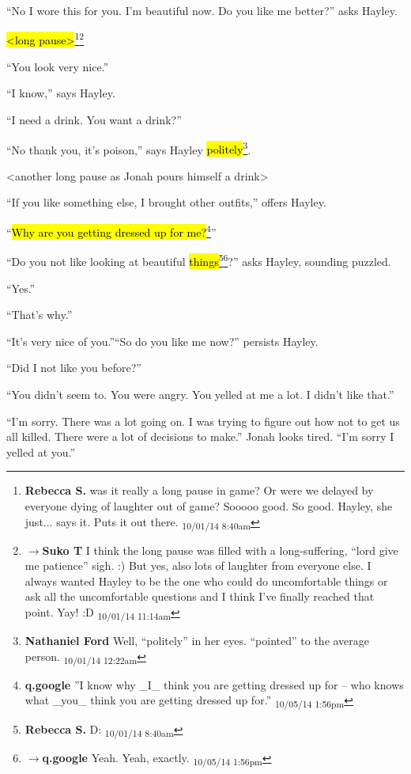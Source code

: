 ``No I wore this for you.  I'm beautiful now.  Do you like me better?'' asks Hayley.

\hl{\textless long pause\textgreater }\footnote{\textbf{Rebecca S. }was it really a long pause in game?  Or were we delayed by everyone dying of laughter out of game?  Sooooo good. So good.  Hayley, she just... says it. Puts it out there. \textsubscript{10/01/14 8:40am}}\footnote{$\rightarrow$\textbf{Suko T }I think the long pause was filled with a long-suffering, ``lord give me patience'' sigh. :)  But yes, also lots of laughter from everyone else.  I always wanted Hayley to be the one who could do uncomfortable things or ask all the uncomfortable questions and I think I've finally reached that point.  Yay! :D \textsubscript{10/01/14 11:14am}}

``You look very nice.''

``I know,'' says Hayley.

``I need a drink.  You want a drink?''

``No thank you, it's poison,'' says Hayley \hl{politely}\footnote{\textbf{Nathaniel Ford }Well, ``politely'' in her eyes. ``pointed'' to the average person. \textsubscript{10/01/14 12:22am}}.

\textless another long pause as Jonah pours himself a drink\textgreater 

``If you like something else, I brought other outfits,'' offers Hayley.

``\hl{Why are you getting dressed up for me?}\footnote{\textbf{q.google }''I know why \_I\_ think you are getting dressed up for -- who knows what \_you\_ think you are getting dressed up for.'' \textsubscript{10/05/14 1:56pm}}''

``Do you not like looking at beautiful \hl{things}\footnote{\textbf{Rebecca S. }D: \textsubscript{10/01/14 8:40am}}\footnote{$\rightarrow$\textbf{q.google }Yeah.  Yeah, exactly. \textsubscript{10/05/14 1:56pm}}?'' asks Hayley, sounding puzzled.

``Yes.''

``That's why.''

``It's very nice of you.''``So do you like me now?'' persists Hayley.

``Did I not like you before?''

``You didn't seem to.  You were angry.  You yelled at me a lot.  I didn't like that.''

``I'm sorry.  There was a lot going on.  I was trying to figure out how not to get us all killed.  There were a lot of decisions to make.''  Jonah looks tired. ``I'm sorry I yelled at you.''

